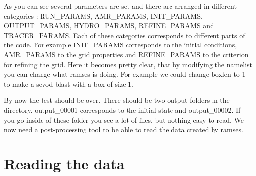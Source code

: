 \documentclass{article}
\begin{document}
As you can see several parameters are set and there are arranged in different categories : RUN\_PARAMS,  AMR\_PARAMS,  INIT\_PARAMS,  OUTPUT\_PARAMS,  HYDRO\_PARAMS,  REFINE\_PARAMS and  TRACER\_PARAMS. Each of these categories corresponds to different parts of the code. For example INIT\_PARAMS corresponds to the initial conditions, AMR\_PARAMS to the grid properties and REFINE\_PARAMS to the criterion for refining the grid. Here it becomes pretty clear, that by modifying the namelist you can change what ramses is doing. For example we could change boxlen to 1 to make a sevod blast with a box of size 1. 

By now the test should be over. There should be two output folders in the directory. output\_00001 corresponds to the initial state and output\_00002. If you go inside of these folder you see a lot of files, but nothing easy to read. We now need a post-processing tool to be able to read the data created by ramses.
\section{Reading the data}
\end{document}
